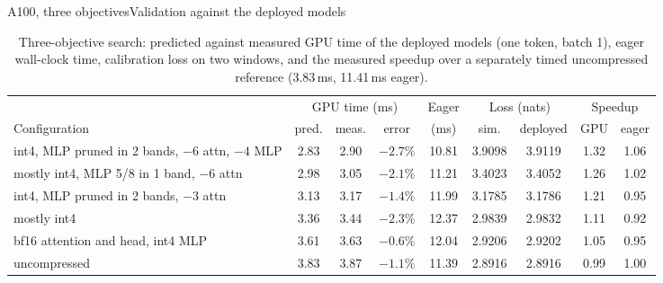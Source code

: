 \documentclass[aspectratio=169,10pt]{beamer}
\begin{document}
\begin{frame}{A100, three objectives}{Validation against the deployed models}
\begin{table}
\centering
\begin{adjustbox}{width=\linewidth, totalheight=0.64\textheight, keepaspectratio, center}
\centering
\footnotesize
\setlength{\tabcolsep}{4pt}
\begin{tabular}{lcccccccc}
\toprule
& \multicolumn{3}{c}{GPU time (ms)} & Eager & \multicolumn{2}{c}{Loss (nats)} & \multicolumn{2}{c}{Speedup} \\
\cmidrule(lr){2-4}\cmidrule(lr){6-7}\cmidrule(lr){8-9}
Configuration & pred. & meas. & error & (ms) & sim. & deployed & GPU & eager \\
\midrule
int4, MLP pruned in 2 bands, $-6$ attn, $-4$ MLP  & 2.83 & 2.90 & $-2.7\%$ & 10.81 & 3.9098 & 3.9119 & 1.32 & 1.06 \\
mostly int4, MLP 5/8 in 1 band, $-6$ attn  & 2.98 & 3.05 & $-2.1\%$ & 11.21 & 3.4023 & 3.4052 & 1.26 & 1.02 \\
int4, MLP pruned in 2 bands, $-3$ attn            & 3.13 & 3.17 & $-1.4\%$ & 11.99 & 3.1785 & 3.1786 & 1.21 & 0.95 \\
mostly int4                                       & 3.36 & 3.44 & $-2.3\%$ & 12.37 & 2.9839 & 2.9832 & 1.11 & 0.92 \\
bf16 attention and head, int4 MLP                 & 3.61 & 3.63 & $-0.6\%$ & 12.04 & 2.9206 & 2.9202 & 1.05 & 0.95 \\
uncompressed                                      & 3.83 & 3.87 & $-1.1\%$ & 11.39 & 2.8916 & 2.8916 & 0.99 & 1.00 \\
\bottomrule
\end{tabular}
\end{adjustbox}
\caption{Three-objective search: predicted against measured GPU time of the deployed models (one token,
batch 1), eager wall-clock time, calibration loss on two windows, and the measured speedup over a
separately timed uncompressed reference (3.83\,ms, 11.41\,ms eager).}\label{tab:a100-3obj-validation}
\end{table}
\end{frame}
\end{document}
